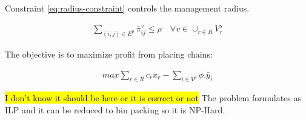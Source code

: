 Constraint \ref{eq:radius-constraint} controls the management radius.

\begin{align}\label{eq:radius-constraint}
    \sum_{(i, j) \in E^p} \bar{\pi}_{ij}^{v} \le \rho
    \quad
    \forall v \in \cup_{r \in R} V^s_r
\end{align}

The objective is to maximize profit from placing chains:

\begin{align}
    max \sum_{r \in R} c_r x_r - \sum_{i \in V^p} \phi . \bar{y}_i
\end{align}

\hl{I don't know it should be here or it is correct or not}
The problem formulates as ILP and it can be reduced to bin packing so it is NP-Hard.